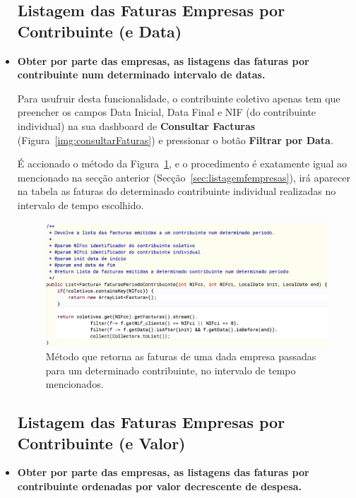 \documentclass[a4paper]{article}
\begin{document}
\begin{itemize}
\subsection{Listagem das Faturas Empresas por Contribuinte (e Data)}
\label{sec:listagemfempresascd}

\item \textbf{Obter por parte das empresas, as listagens das faturas por contribuinte num
determinado intervalo de datas.}

Para usufruir desta funcionalidade, o contribuinte coletivo apenas tem que preencher
os campos \textrm{Data Inicial}, \textrm{Data Final} e \textrm{NIF}
(do contribuinte individual) na sua dashboard
de \textbf{Consultar Facturas} (Figura~\ref{img:consultarFaturas})
e pressionar o botão \textbf{Filtrar por Data}.

É accionado o método da Figura~\ref{img:faturasPeriodoContribuinte},
e o procedimento é exatamente igual ao mencionado na secção anterior
(Secção~\ref{sec:listagemfempresas}), irá aparecer na tabela as faturas do
determinado contribuinte individual realizadas no intervalo de tempo
escolhido.

\begin{figure}[H]
\centering
\includegraphics[scale=0.35]{imgs/faturasPeriodoContribuinte.png}
\caption{Método que retorna as faturas de uma dada empresa passadas para um determinado contribuinte,
no intervalo de tempo mencionados.}
\label{img:faturasPeriodoContribuinte}
\end{figure}



\subsection{Listagem das Faturas Empresas por Contribuinte (e Valor)}
\label{sec:listagemfempresascv}

\item \textbf{Obter por parte das empresas, as listagens das faturas por contribuinte ordenadas
por valor decrescente de despesa.}


\end{itemize}
\end{document}
